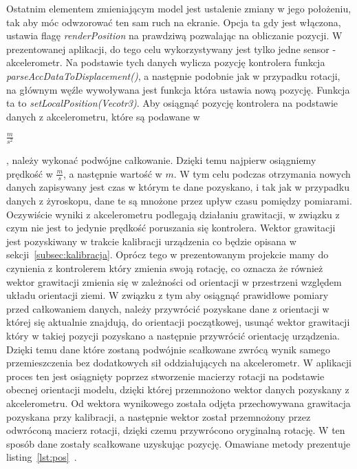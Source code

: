 	Ostatnim elementem zmieniającym model jest ustalenie zmiany w jego położeniu, tak aby móc odwzorować ten sam ruch na ekranie. Opcja ta gdy jest włączona, ustawia flagę \textit{renderPosition} na prawdziwą pozwalając na obliczanie pozycji. W prezentowanej aplikacji, do tego celu wykorzystywany jest tylko jedne sensor - akcelerometr. Na podstawie tych danych wylicza pozycję kontrolera funkcja \textit{parseAccDataToDisplacement()}, a następnie podobnie jak w przypadku rotacji, na głównym węźle wywoływana jest funkcja która ustawia nową pozycję. Funkcja ta to \textit{setLocalPosition(Vecotr3)}. Aby osiągnąć pozycję kontrolera na podstawie danych z akcelerometru, które są podawane w \begin{Large}
	$\frac{m}{s^2}$
	\end{Large}, należy wykonać podwójne całkowanie. Dzięki temu najpierw osiągniemy prędkość w {\Large$\frac{m}{s}$}, a następnie wartość w $m$. W tym celu podczas otrzymania nowych danych zapisywany jest czas w którym te dane pozyskano, i tak jak w przypadku danych z żyroskopu, dane te są mnożone przez upływ czasu pomiędzy pomiarami. Oczywiście wyniki z akcelerometru podlegają działaniu grawitacji, w związku z czym nie jest to jedynie prędkość poruszania się kontrolera. Wektor grawitacji jest pozyskiwany w trakcie kalibracji urządzenia co będzie opisana w sekcji~\ref{subsec:kalibracja}. Oprócz tego w prezentowanym projekcie mamy do czynienia z kontrolerem który zmienia swoją rotację, co oznacza że również wektor grawitacji zmienia się w zależności od orientacji w przestrzeni względem układu orientacji ziemi. W związku z tym aby osiągnąć prawidłowe pomiary przed całkowaniem danych, należy przywrócić pozyskane dane z orientacji w której się aktualnie znajdują, do orientacji początkowej, usunąć wektor grawitacji który w takiej pozycji pozyskano a następnie przywrócić orientację urządzenia. Dzięki temu dane które zostaną podwójnie scałkowane zwrócą wynik samego przemieszczenia bez dodatkowych sił oddziałujących na akcelerometr. W aplikacji proces ten jest osiągnięty poprzez stworzenie macierzy rotacji na podstawie obecnej orientacji modelu, dzięki której przemnożono wektor danych pozyskany z akcelerometru. Od wektora wynikowego została odjęta przechowywana grawitacja pozyskana przy kalibracji, a następnie wektor został przemnożony przez odwróconą macierz rotacji, dzięki czemu przywrócono oryginalną rotację. W ten sposób dane zostały scałkowane uzyskując pozycję. Omawiane metody prezentuje listing~\ref{lst:pos}~\cite{displacement3, displacement2, displacement}.
